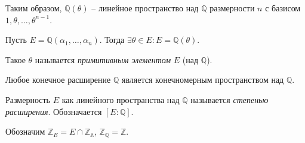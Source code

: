 Таким образом, $\mathbb{Q}(\theta)$ -- линейное пространство над $\mathbb{Q}$ размерности $n$ с базисом $1, \theta, \ldots, \theta^{n - 1}$.

\begin{theorem} \label{l11_th4}
	Пусть $E = \mathbb{Q}(\alpha_1, \ldots, \alpha_n)$. Тогда $\exists \theta \in E: E = \mathbb{Q}(\theta)$.
\end{theorem}

\begin{definition}
	Такое $\theta$ называется \textit{примитивным элементом} $E$ (над $\mathbb{Q}$).
\end{definition}

\begin{corollary}
	Любое конечное расширение $\mathbb{Q}$ является конечномерным пространством над $\mathbb{Q}$.
\end{corollary}

\begin{definition}
	Размерность $E$ как линейного пространства над $\mathbb{Q}$ называется \textit{степенью расширения}. 
	Обозначается $[E \colon \mathbb{Q}]$.
\end{definition}

Обозначим $\mathbb{Z}_E = E \cap \mathbb{Z_A}$, $\mathbb{Z_Q} = \mathbb{Z}$.